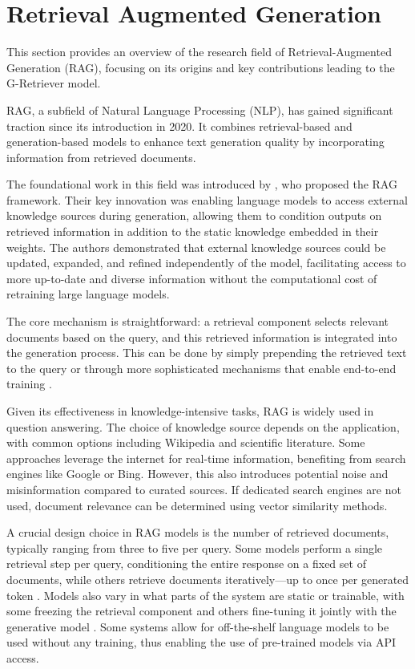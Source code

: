 \section{Retrieval Augmented Generation}
This section provides an overview of the research field of Retrieval-Augmented Generation (RAG), focusing on its origins and key contributions leading to the G-Retriever model.

RAG, a subfield of Natural Language Processing (NLP), has gained significant traction since its introduction in 2020. It combines retrieval-based and generation-based models to enhance text generation quality by incorporating information from retrieved documents.

The foundational work in this field was introduced by \cite{rag}, who proposed the RAG framework.
Their key innovation was enabling language models to access external knowledge sources during generation, allowing them to condition outputs on retrieved information in addition to the static knowledge embedded in their weights.
The authors demonstrated that external knowledge sources could be updated, expanded, and refined independently of the model, facilitating access to more up-to-date and diverse information without the computational cost of retraining large language models.

The core mechanism is straightforward: a retrieval component selects relevant documents based on the query, and this retrieved information is integrated into the generation process.
This can be done by simply prepending the retrieved text to the query or through more sophisticated mechanisms that enable end-to-end training \cite{in-context}.

Given its effectiveness in knowledge-intensive tasks, RAG is widely used in question answering.
The choice of knowledge source depends on the application, with common options including Wikipedia and scientific literature.
Some approaches leverage the internet for real-time information, benefiting from search engines like Google or Bing.
However, this also introduces potential noise and misinformation compared to curated sources.
If dedicated search engines are not used, document relevance can be determined using vector similarity methods.

A crucial design choice in RAG models is the number of retrieved documents, typically ranging from three to five per query.
Some models perform a single retrieval step per query, conditioning the entire response on a fixed set of documents, while others retrieve documents iteratively—up to once per generated token \cite{rag}.
Models also vary in what parts of the system are static or trainable, with some freezing the retrieval component and others fine-tuning it jointly with the generative model \cite{realm}.
Some systems allow for off-the-shelf language models to be used without any training, thus enabling the use of pre-trained models via API access.

